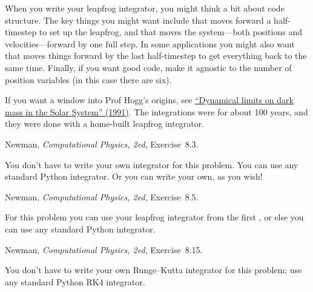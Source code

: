 \documentclass[12pt]{article}
\begin{document}
\begin{note}
  When you write your leapfrog integrator, you might think a bit about code structure.
  The key things you might want include  that moves forward a half-timestep to set up the leapfrog,
  and  that moves the system---both positions and velocities---forward by one full step.
  In some applications you might also want  that moves things forward by the last half-timestep to get everything back to the same time.
  Finally, if you want good code, make it agnostic to the number of position variables (in this case there are six).
\end{note}

\begin{note}
  If you want a window into Prof Hogg's origins, see \href{https://ui.adsabs.harvard.edu/scan/manifest/1991AJ....101.2274H?art=true}{``Dynamical limits on dark mass in the Solar System'' (1991)}.
  The integrations were for about 100 years, and they were done with a home-built leapfrog integrator.
\end{note}

\begin{problem}
  Newman, \textit{Computational Physics, 2ed}, Exercise~8.3.
\end{problem}

\begin{note}
  You don't have to write your own integrator for this problem.
  You can use any standard Python integrator.
  Or you can write your own, as you wish!
\end{note}

\begin{problem}
  Newman, \textit{Computational Physics, 2ed}, Exercise~8.5.
\end{problem}

\begin{note}
  For this problem you can use your leapfrog integrator from the first \problemname,
  or else you can use any standard Python integrator.
\end{note}

\begin{problem}
  Newman, \textit{Computational Physics, 2ed}, Exercise~8.15.
\end{problem}

\begin{note}
  You don't have to write your own Runge--Kutta integrator for this problem;
  use any standard Python RK4 integrator.
\end{note}
\end{document}
